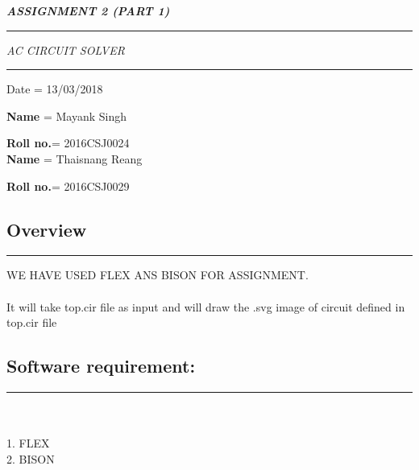 \documentclass{article}
\begin{document}
\begin{center}

\begin{Huge}

\textbf{\textit{ASSIGNMENT 2 (PART 1)}}
\noindent
{\color{red} \rule{\linewidth}{0.5mm} }
\textit{AC CIRCUIT SOLVER}
\noindent
{\color{red} \rule{\linewidth}{0.3mm} }
\end{Huge}
Date = 13/03/2018
\end{center}

\begin{large}




\color{red}\textbf{Name} = \color{black}Mayank Singh 

 
\color{red}\textbf{Roll no.}=\color{black}  2016CSJ0024\\


\color{red}\textbf{Name} =\color{black} Thaisnang Reang

  
\color{red}\textbf{Roll no.}=  \color{black}2016CSJ0029

\end{large}

\newpage
\begin{huge}
\section{Overview}
\end{huge}
\noindent
{\color{red} \rule{\linewidth}{0.2mm} }
WE HAVE USED FLEX ANS BISON FOR ASSIGNMENT.\\
\\
It will take top.cir file as input and will draw the .svg image of circuit defined in top.cir file



\hspace*{-5cm}%
\begin{huge}
\section{Software requirement:}
\noindent
{\color{red} \rule{\linewidth}{0.2mm} }
\end{huge}
\\
\\1. FLEX
\\2. BISON
\end{document}
